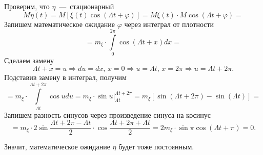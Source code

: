 Проверим, что $ \eta $~---~стационарный
\begin{equation*}
  M \eta \left( t \right) =
  M \left[ \xi \left( t \right) \cos \left( \Lambda t + \varphi \right) \right] =
  M \xi \left( t \right) \cdot M \cos \left( \Lambda t + \varphi \right) =
\end{equation*}
Запишем математическое ожидание $ \varphi $ через интеграл от плотности
\begin{equation*}
  = m_{ \xi } \cdot \int \limits_0^{2 \pi } \cos \left( \Lambda t + x \right) dx =
\end{equation*}
Сделаем замену
\begin{equation*}
  \Lambda t + x = u \Rightarrow du = dx, \,
  x = 0 \Rightarrow u = \Lambda t, \,
  x = 2 \pi \Rightarrow u = \Lambda t + 2 \pi.
\end{equation*}
Подставив замену в интеграл, получим
\begin{equation*}
  = m_{ \xi } \cdot \int \limits_{ \Lambda t}^{ \Lambda t + 2 \pi } \cos u du =
  m_{ \xi } \cdot \left. \sin u \right|_{ \Lambda t}^{ \Lambda t + 2 \pi } =
  m_{ \xi } \left[ \sin \left( \Lambda t + 2 \pi \right) - \sin \left( \Lambda t \right) \right] =
\end{equation*}
Запишем разность синусов через произведение синуса на косинус
\begin{equation*}
  = m_{ \xi } \cdot 2 \sin \frac{ \Lambda t + 2 \pi - \Lambda t}{2} \cdot
  \cos \frac{ \Lambda t + 2 \pi + \Lambda t}{2} =
  2m_{ \xi } \cdot \sin \pi \cos \left( \Lambda t + \pi \right) =
  0.
\end{equation*}

Значит, математическое ожидание $ \eta $ будет тоже постоянным.

